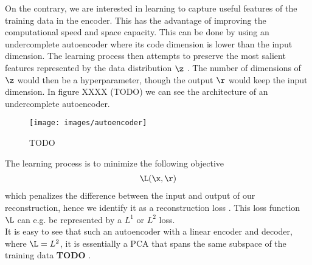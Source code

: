 On the contrary, we are interested in learning to capture useful features of the training data in the encoder. This has the advantage of improving the computational speed and space capacity. This can be done by using an undercomplete autoencoder where its code dimension is lower than the input dimension. The learning process then attempts to preserve the most salient features represented by the data distribution $\z$ \cite[Chp.~14]{Goodfellow-et-al-2016}. The number of dimensions of $\z$ would then be a hyperparameter, though the output $\r$ would keep the input dimension. In figure XXXX (TODO) we can see the architecture of an undercomplete autoencoder.
\begin{figure}[H]
    \centering
    \texttt{[image: images/autoencoder]}
    \caption{TODO}
    \label{fig:autoencoder}
\end{figure}
The learning process is to minimize the following objective
\begin{align} \label{eq:1}
\L(\x, \r)
\end{align}
which penalizes the difference between the input and output of our reconstruction, hence we identify it as a reconstruction loss \cite[Chp.~14]{Goodfellow-et-al-2016}. This loss function $\L$ can e.g. be represented by a $L^1$ or $L^2$ loss. \\
It is easy to see that such an autoencoder with a linear encoder and decoder, where $\L = L^2$, it is essentially a PCA that spans the same subspace of the training data \textbf{TODO} \cite[Chp.~14]{Goodfellow-et-al-2016}.

